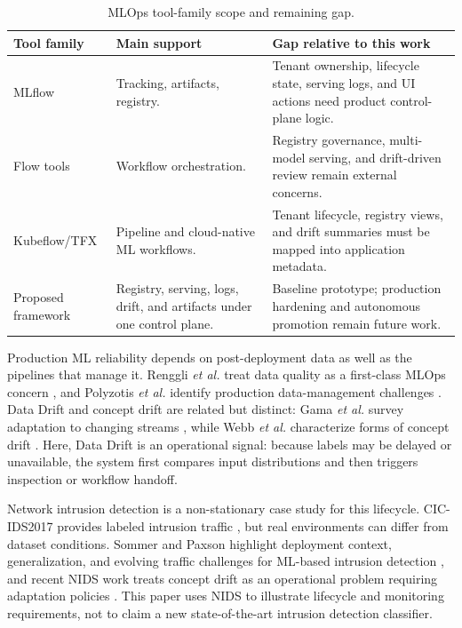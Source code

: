 \documentclass[runningheads]{llncs}
\begin{document}
\begin{table}[t]
\caption{MLOps tool-family scope and remaining gap.}
\label{tab:mlops-tool-gap}
\centering
\small
\begin{tabular}{@{}L{2.2cm}L{3.2cm}L{5.8cm}@{}}
\toprule
\textbf{Tool family} & \textbf{Main support} & \textbf{Gap relative to this work} \\
\midrule
MLflow & Tracking, artifacts, registry. & Tenant ownership, lifecycle state, serving logs, and UI actions need product control-plane logic. \\
Flow tools & Workflow orchestration. & Registry governance, multi-model serving, and drift-driven review remain external concerns. \\
Kubeflow/TFX & Pipeline and cloud-native ML workflows. & Tenant lifecycle, registry views, and drift summaries must be mapped into application metadata. \\
Proposed framework & Registry, serving, logs, drift, and artifacts under one control plane. & Baseline prototype; production hardening and autonomous promotion remain future work. \\
\bottomrule
\end{tabular}
\end{table}

Production ML reliability depends on post-deployment data as well as the pipelines that manage it. Renggli \textit{et al.} treat data quality as a first-class MLOps concern \cite{renggli2021data}, and Polyzotis \textit{et al.} identify production data-management challenges \cite{polyzotis2017data}. Data Drift and concept drift are related but distinct: Gama \textit{et al.} survey adaptation to changing streams \cite{gama2014survey}, while Webb \textit{et al.} characterize forms of concept drift \cite{webb2016drift}. Here, Data Drift is an operational signal: because labels may be delayed or unavailable, the system first compares input distributions and then triggers inspection or workflow handoff.

Network intrusion detection is a non-stationary case study for this lifecycle. CIC-IDS2017 provides labeled intrusion traffic \cite{cicids}, but real environments can differ from dataset conditions. Sommer and Paxson highlight deployment context, generalization, and evolving traffic challenges for ML-based intrusion detection \cite{sommer2010closedworld}, and recent NIDS work treats concept drift as an operational problem requiring adaptation policies \cite{Zhang2025SSFNIDS}. This paper uses NIDS to illustrate lifecycle and monitoring requirements, not to claim a new state-of-the-art intrusion detection classifier.
\end{document}
